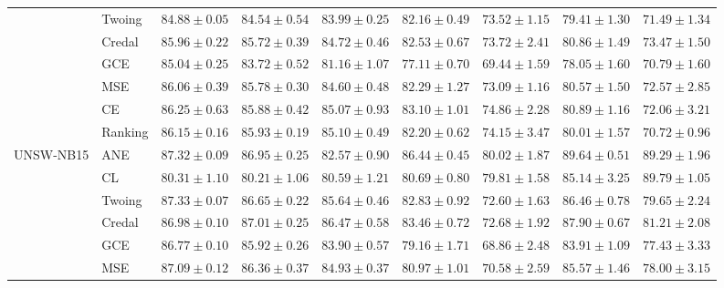 \documentclass[letterpaper]{article} %
\begin{document}
\begin{table}[t]
\begin{tabular}{clccccccc}
 & Twoing & $84.88 \pm 0.05$ & $84.54 \pm 0.54$ & $83.99 \pm 0.25$ & $\mathbf{82.16 \pm 0.49}$ & $\mathbf{73.52 \pm 1.15}$ & $\mathbf{79.41 \pm 1.30}$ & $\mathbf{71.49 \pm 1.34}$ \\
 & Credal & $\mathbf{85.96 \pm 0.22}$ & $\mathbf{85.72 \pm 0.39}$ & $\mathbf{84.72 \pm 0.46}$ & $\mathbf{82.53 \pm 0.67}$ & $\mathbf{73.72 \pm 2.41}$ & $\mathbf{80.86 \pm 1.49}$ & $\mathbf{73.47 \pm 1.50}$ \\
 & GCE    & $85.04 \pm 0.25$ & $83.72 \pm 0.52$ & $81.16 \pm 1.07$ & $77.11 \pm 0.70$ & $69.44 \pm 1.59$ & $78.05 \pm 1.60$ & $70.79 \pm 1.60$ \\
 & MSE    & $\mathbf{86.06 \pm 0.39}$ & $\mathbf{85.78 \pm 0.30}$ & $\mathbf{84.60 \pm 0.48}$ & $\mathbf{82.29 \pm 1.27}$ & $\mathbf{73.09 \pm 1.16}$ & $\mathbf{80.57 \pm 1.50}$ & $\mathbf{72.57 \pm 2.85}$ \\
 & CE     & $\mathbf{86.25 \pm 0.63}$ & $\mathbf{85.88 \pm 0.42}$ & $\mathbf{85.07 \pm 0.93}$ & $\mathbf{83.10 \pm 1.01}$ & $\mathbf{74.86 \pm 2.28}$ & $\mathbf{80.89 \pm 1.16}$ & $\mathbf{72.06 \pm 3.21}$ \\
 & Ranking & $\mathbf{86.15 \pm 0.16}$ & $\mathbf{85.93 \pm 0.19}$ & $\mathbf{85.10 \pm 0.49}$ & $\mathbf{82.20 \pm 0.62}$ & $\mathbf{74.15 \pm 3.47}$ & $\mathbf{80.01 \pm 1.57}$ & $70.72 \pm 0.96$ \\
\hline
\multirow{8}{*}{UNSW-NB15}
 & ANE    & $\mathbf{87.32 \pm 0.09}$ & $\mathbf{86.95 \pm 0.25}$ & $82.57 \pm 0.90$ & $\mathbf{86.44 \pm 0.45}$ & $\mathbf{80.02 \pm 1.87}$ & $\mathbf{89.64 \pm 0.51}$ & $\mathbf{89.29 \pm 1.96}$ \\
 & CL     & $80.31 \pm 1.10$ & $80.21 \pm 1.06$ & $80.59 \pm 1.21$ & $80.69 \pm 0.80$ & $\mathbf{79.81 \pm 1.58}$ & $85.14 \pm 3.25$ & $\mathbf{89.79 \pm 1.05}$ \\
 & Twoing & $\mathbf{87.33 \pm 0.07}$ & $\mathbf{86.65 \pm 0.22}$ & $85.64 \pm 0.46$ & $82.83 \pm 0.92$ & $72.60 \pm 1.63$ & $86.46 \pm 0.78$ & $79.65 \pm 2.24$ \\
 & Credal & $86.98 \pm 0.10$ & $\mathbf{87.01 \pm 0.25}$ & $\mathbf{86.47 \pm 0.58}$ & $83.46 \pm 0.72$ & $72.68 \pm 1.92$ & $87.90 \pm 0.67$ & $81.21 \pm 2.08$ \\
 & GCE    & $86.77 \pm 0.10$ & $85.92 \pm 0.26$ & $83.90 \pm 0.57$ & $79.16 \pm 1.71$ & $68.86 \pm 2.48$ & $83.91 \pm 1.09$ & $77.43 \pm 3.33$ \\
 & MSE    & $87.09 \pm 0.12$ & $86.36 \pm 0.37$ & $84.93 \pm 0.37$ & $80.97 \pm 1.01$ & $70.58 \pm 2.59$ & $85.57 \pm 1.46$ & $78.00 \pm 3.15$ \\

\end{tabular}
\end{table}
\end{document}

